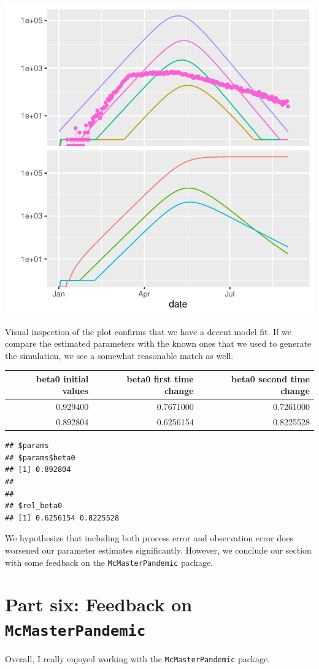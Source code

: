 \documentclass{article}\usepackage[]{graphicx}\usepackage[]{color}
\makeatletter
\def\maxwidth{ %
  \ifdim\Gin@nat@width>\linewidth
    \linewidth
  \else
    \Gin@nat@width
  \fi
}
\newenvironment{kframe}{%
 \def\at@end@of@kframe{}%
 \ifinner\ifhmode%
  \def\at@end@of@kframe{\end{minipage}}%
  \begin{minipage}{\columnwidth}%
 \fi\fi%
 \def\FrameCommand##1{\hskip\@totalleftmargin \hskip-\fboxsep
 \colorbox{shadecolor}{##1}\hskip-\fboxsep
     \hskip-\linewidth \hskip-\@totalleftmargin \hskip\columnwidth}%
 \MakeFramed {\advance\hsize-\width
   \@totalleftmargin\z@ \linewidth\hsize
   \@setminipage}}%
 {\par\unskip\endMakeFramed%
 \at@end@of@kframe}
\newenvironment{knitrout}{}{} %
\makeatother
\begin{document}
\begin{knitrout}
\color{fgcolor}
\includegraphics[width=\maxwidth]{figure/main-1} 

\end{knitrout}

Visual inspection of the plot confirms that we have a decent model fit. If we compare the estimated parameters with the known ones that we used to generate the simulation, we see a somewhat reasonable match as well.

\begin{knitrout}
\color{fgcolor}
\begin{tabular}{r|r|r}
\hline
beta0 initial values & beta0 first time change & beta0 second time change\\
\hline
0.929400 & 0.7671000 & 0.7261000\\
\hline
0.892804 & 0.6256154 & 0.8225528\\
\hline
\end{tabular}

\begin{kframe}\begin{verbatim}
## $params
## $params$beta0
## [1] 0.892804
## 
## 
## $rel_beta0
## [1] 0.6256154 0.8225528
\end{verbatim}
\end{kframe}
\end{knitrout}

We hypothesize that including both process error and observation error does worsened our parameter estimates significantly. However, we conclude our section with some feedback on the \texttt{McMasterPandemic} package.

\section{Part six: Feedback on \texttt{McMasterPandemic}}
Overall, I really enjoyed working with the \texttt{McMasterPandemic} package.
\end{document}

